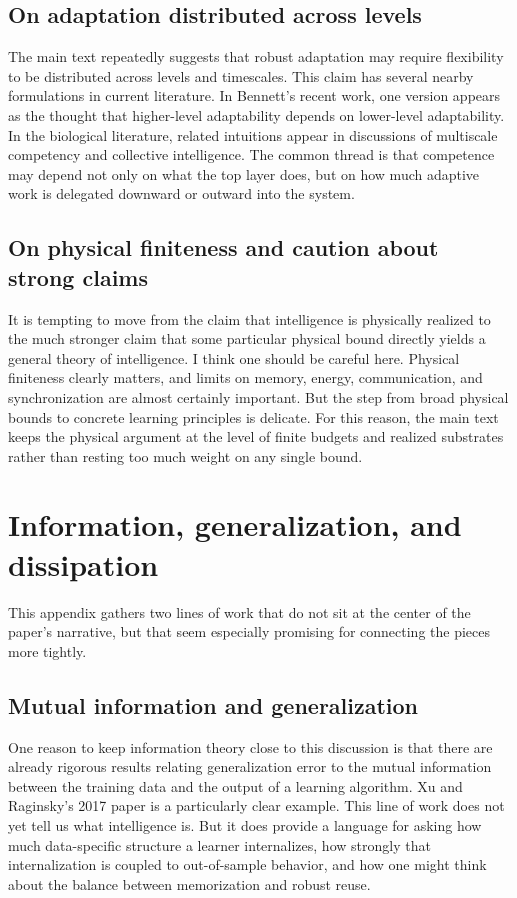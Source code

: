 \documentclass[11pt]{article}
\begin{document}
\subsection{On adaptation distributed across levels}

The main text repeatedly suggests that robust adaptation may require flexibility to be distributed across levels and timescales. This claim has several nearby formulations in current literature. In Bennett's recent work, one version appears as the thought that higher-level adaptability depends on lower-level adaptability. In the biological literature, related intuitions appear in discussions of multiscale competency and collective intelligence. The common thread is that competence may depend not only on what the top layer does, but on how much adaptive work is delegated downward or outward into the system.

\subsection{On physical finiteness and caution about strong claims}

It is tempting to move from the claim that intelligence is physically realized to the much stronger claim that some particular physical bound directly yields a general theory of intelligence. I think one should be careful here. Physical finiteness clearly matters, and limits on memory, energy, communication, and synchronization are almost certainly important. But the step from broad physical bounds to concrete learning principles is delicate. For this reason, the main text keeps the physical argument at the level of finite budgets and realized substrates rather than resting too much weight on any single bound.

\section{Information, generalization, and dissipation}

This appendix gathers two lines of work that do not sit at the center of the paper's narrative, but that seem especially promising for connecting the pieces more tightly.

\subsection{Mutual information and generalization}

One reason to keep information theory close to this discussion is that there are already rigorous results relating generalization error to the mutual information between the training data and the output of a learning algorithm. Xu and Raginsky's 2017 paper is a particularly clear example. This line of work does not yet tell us what intelligence is. But it does provide a language for asking how much data-specific structure a learner internalizes, how strongly that internalization is coupled to out-of-sample behavior, and how one might think about the balance between memorization and robust reuse.
\end{document}
